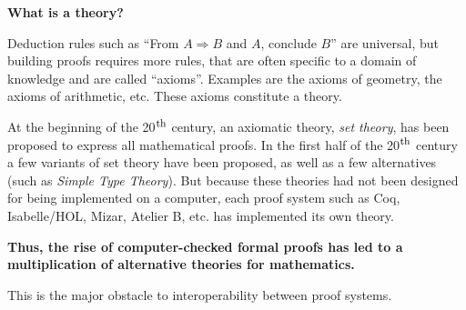 \begin{framed}
\vspace*{-0.5cm}
  \begin{center}
{\bf \Large What is a theory?}
\end{center}

Deduction rules such as ``From $A \Rightarrow B$ and $A$, conclude
$B$'' are universal, but building proofs requires more rules, that are
often specific to a domain of knowledge and are called
``axioms''. Examples are the axioms of geometry, the axioms of
arithmetic, etc. These axioms constitute a theory.

At the beginning of the 20$^{\mbox{\footnotesize th}}$ century, an
axiomatic theory, {\em set theory}, has been proposed to express all
mathematical proofs. In the first half of the 20$^{\mbox{\footnotesize
    th}}$ century a few variants of set theory have been proposed, as
well as a few alternatives (such as \emph{Simple Type Theory}).  But
because these theories had not been designed for being implemented on
a computer, each proof system such as Coq, Isabelle/HOL, Mizar,
Atelier B, etc. has implemented its own theory.  {\bf Thus, the rise of
computer-checked formal proofs has led to a multiplication of
alternative theories for mathematics.

This is the major obstacle to interoperability between proof systems.}
\end{framed}



